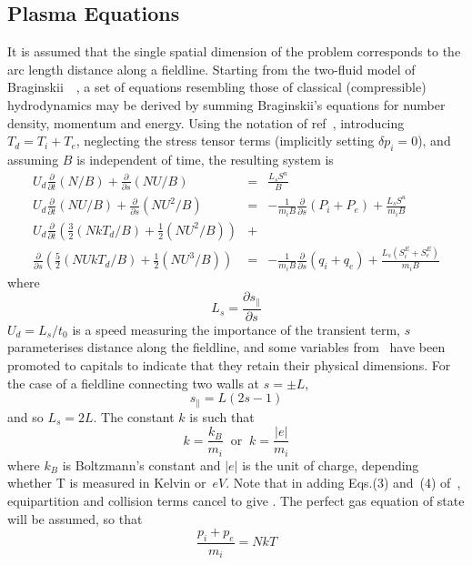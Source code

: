 \subsection{Plasma Equations}\label{sec:sys23plas}
It is assumed that the single spatial dimension of the problem
corresponds to the arc length distance along a fieldline.
Starting from the two-fluid model of Braginskii~~\cite{Br65Tranwarv},
a set of equations resembling those of classical (compressible) hydrodynamics
may be derived by summing Braginskii's equations for number density,
momentum and energy.
Using the notation of ref~\cite{Ha13Benc}, introducing $T_d=T_i+T_e$,
neglecting the stress tensor terms (implicitly setting $\delta p_i=0$),
and assuming $B$ is independent of time, the resulting system is
\begin{eqnarray}\label{eq:sysn1}
U_d \frac{\partial}{\partial t} (N/B)+ 
\frac{\partial}{\partial s} (N U/B)&=&\frac{L_s S^n}{B} \\
U_d \frac{\partial}{\partial t} (N U/B)+ 
\frac{\partial}{\partial s} (N U^2/B)&=&
-\frac{1}{m_i B}\frac{\partial}{\partial s} (P_i + P_e) +\frac{L_s S^u}{m_i B} \label{eq:sysu1}\\
U_d \frac{\partial}{\partial t}\left( \frac{3}{2}(N kT_d/B)+
\frac{1}{2} (N U^2/B) \right) &+&\\
\frac{\partial}{\partial s} \left( \frac{5}{2}(N U kT_d/B) +
\frac{1}{2} (N U^3/B) \right) &=&
-\frac{1}{m_i B}\frac{\partial}{\partial s} (q_i + q_e) +
\frac{L_s (S_i^E+S_e^E)}{m_i B} \label{eq:syst1}
\end{eqnarray}
where 
\begin{equation}\label{eq:hs}
L_s= \frac{\partial s_{\parallel}}{\partial s}
\end{equation}
$U_d =L_s/t_0$ is a speed measuring the importance of the transient term, $s$ parameterises
distance along the fieldline,
and some variables from~\cite{Ha13Benc} have been promoted to capitals to 
indicate that they retain their physical dimensions.
For the case of a fieldline connecting two walls at $s=\pm L$, 
\begin{equation}\label{eq:spar}
s_{\parallel}=L(2s-1)
\end{equation}
and so $L_s=2L$.
The constant $k$ is such that
\begin{equation}
k= \frac{k_B}{m_i}\;\;\mbox{or}\;\;k=\frac{|e|}{m_i}
\end{equation}
where $k_B$ is Boltzmann's constant and $|e|$ is the unit of charge, depending whether T is measured in Kelvin or~$eV$. 
Note that in adding Eqs.(3) and~(4) of~\cite{Ha13Benc}, equipartition and collision terms cancel 
to give . The perfect gas equation of state will be assumed, so that
\begin{equation}\label{eq:sysp}
\frac{p_i+p_e}{m_i}=N k T
\end{equation}


